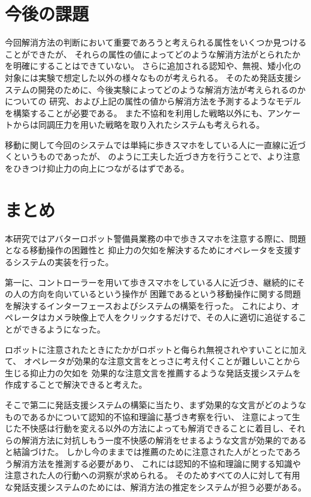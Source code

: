\documentclass{kuisthesis}
\begin{document}
\section{今後の課題}
今回解消方法の判断において重要であろうと考えられる属性をいくつか見つけることができたが、
それらの属性の値によってどのような解消方法がとられたかを明確にすることはできていない。
さらに追加される認知や、無視、矮小化の対象には実験で想定した以外の様々なものが考えられる。
そのため発話支援システムの開発のために、今後実験によってどのような解消方法が考えられるのかについての
研究、および上記の属性の値から解消方法を予測するようなモデルを構築することが必要である。
また不協和を利用した戦略以外にも、アンケートからは同調圧力を用いた戦略を取り入れたシステムも考えられる。


移動に関して今回のシステムでは単純に歩きスマホをしている人に一直線に近づくというものであったが、
\cite{Mizumaru2019}のように工夫した近づき方を行うことで、より注意をひきつけ抑止力の向上につながるはずである。
\section{まとめ}
本研究ではアバターロボット警備員業務の中で歩きスマホを注意する際に、問題となる移動操作の困難性と
抑止力の欠如を解決するためにオペレータを支援するシステムの実装を行った。

第一に、コントローラーを用いて歩きスマホをしている人に近づき、継続的にその人の方向を向いているという操作が
困難であるという移動操作に関する問題を解決するインターフェースおよびシステムの構築を行った。
これにより、オペレータはカメラ映像上で人をクリックするだけで、その人に適切に追従することができるようになった。

ロボットに注意されたときにたかがロボットと侮られ無視されやすいことに加えて、
オペレータが効果的な注意文言をとっさに考え付くことが難しいことから生じる抑止力の欠如を
効果的な注意文言を推薦するような発話支援システムを作成することで解決できると考えた。

そこで第二に発話支援システムの構築に当たり、まず効果的な文言がどのようなものであるかについて認知的不協和理論に基づき考察を行い、
注意によって生じた不快感は行動を変える以外の方法によっても解消できることに着目し、それらの解消方法に対抗しもう一度不快感の解消をせまるような文言が効果的であると結論づけた。
しかし今のままでは推薦のために注意された人がとったであろう解消方法を推測する必要があり、
これには認知的不協和理論に関する知識や注意された人の行動への洞察が求められる。
そのためすべての人に対して有用な発話支援システムのためには、解消方法の推定をシステムが担う必要がある。
\end{document}
